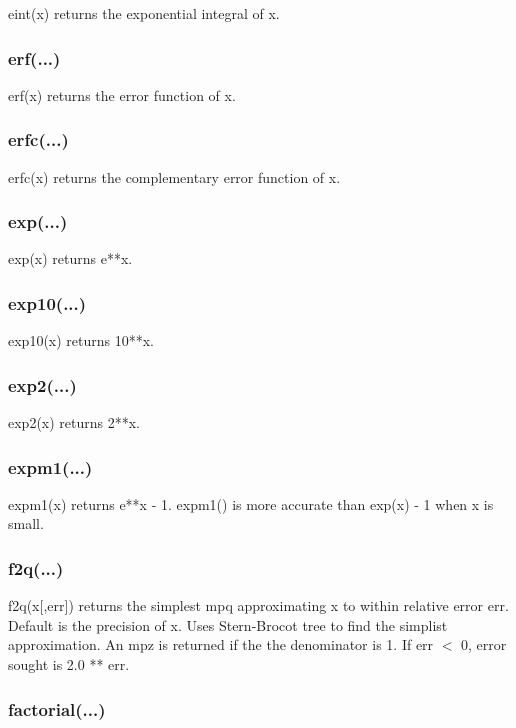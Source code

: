 eint(x) returns the exponential integral of x.

\subsubsection{erf(...)}

erf(x) returns the error function of x.

\subsubsection{erfc(...)}

erfc(x) returns the complementary error function of x.

\subsubsection{exp(...)}

exp(x) returns e**x.

\subsubsection{exp10(...)}

exp10(x) returns 10**x.

\subsubsection{exp2(...)}

exp2(x) returns 2**x.

\subsubsection{expm1(...)}

expm1(x) returns e**x - 1. expm1() is more accurate than exp(x) - 1 when x is small.

\subsubsection{f2q(...)}

f2q(x[,err]) returns the simplest mpq approximating x to within relative error err. Default is the
precision of x. Uses Stern-Brocot tree to find the simplist approximation. An mpz is returned if
the the denominator is 1. If err $<$ 0, error sought is 2.0 ** err.

\subsubsection{factorial(...)}

